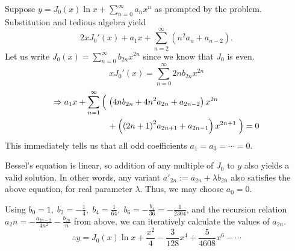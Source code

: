 \item
Suppose $y = J_0(x) \ln x + \sum_{n=0}^\infty a_n x^n$ as prompted by the problem.
Substitution and tedious algebra yield
\[
	2xJ_0'(x) + a_1 x + \sum_{n=2}^\infty (n^2 a_n + a_{n - 2}).
\]
Let us write $J_0(x) = \sum_{n=0}^\infty b_{2n} x^{2n}$ since we know that $J_0$ is even.
\[
	xJ_0'(x) = \sum_{n=0}^\infty 2nb_{2n}x^{2n}
\]
\begin{align*}
	\Rightarrow a_1 x +
	\sum_{n=1}^\infty
	\left( \vphantom{\left( {(x)}^2\right)} \right.
	 & \left( 4nb_{2n} + 4n^2 a_{2n} + a_{2n -2} \right) x^{2n}         \\
	 & + \left( {(2n + 1)}^2 a_{2n + 1} + a_{2n - 1} \right) x^{2n + 1}
	\left. \vphantom{\left( {(x)}^2\right)} \right) = 0
\end{align*}
This immediately tells us that all odd coefficients $a_1 = a_3 = \cdots = 0$.

Bessel's equation is linear, so addition of any multiple of $J_0$ to $y$ also yields a valid solution.
In other words, any variant $a'_{2n} := a_{2n} + \lambda b_{2n}$ also satisfies the above equation, for real parameter $\lambda$.
Thus, we may choose $a_0 = 0$.

Using $b_0 = 1,\; b_2 = -\frac{1}{4},\; b_4 = \frac{1}{64},\; b_6 = -\frac{b_4}{36} = -\frac{1}{2304}$,
and the recursion relation $a_2n = - \frac{a_{2n - 2}}{4n^2} - \frac{b_{2n}}{n}$ from above,
we can iteratively calculate the values of $a_{2n}$.
\[
	\therefore y = J_0(x)\ln x + \frac{x^2}{4} - \frac{3}{128}x^4 + \frac{5}{4608} x^6 - \cdots
\]